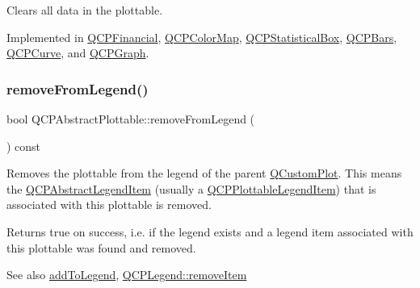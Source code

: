 Clears all data in the plottable. 

Implemented in \mbox{\hyperlink{class_q_c_p_financial_a11fd49928c33e55e27b7319c6927864a}{Q\+C\+P\+Financial}}, \mbox{\hyperlink{class_q_c_p_color_map_a0545dce5383766885912331705a8e099}{Q\+C\+P\+Color\+Map}}, \mbox{\hyperlink{class_q_c_p_statistical_box_a19112994449df0c20287858436cc68e3}{Q\+C\+P\+Statistical\+Box}}, \mbox{\hyperlink{class_q_c_p_bars_a11dbbd707132f07f862dff13c5789c2b}{Q\+C\+P\+Bars}}, \mbox{\hyperlink{class_q_c_p_curve_ae0462c61dbfbac07db0736ec64110241}{Q\+C\+P\+Curve}}, and \mbox{\hyperlink{class_q_c_p_graph_ad4e94a4e44e5e76fbec81a72a977157d}{Q\+C\+P\+Graph}}.

\mbox{\label{class_q_c_p_abstract_plottable_ac95fb2604d9106d0852ad9ceb326fe8c}} 
\subsubsection{\texorpdfstring{remove\+From\+Legend()}{removeFromLegend()}}
{\footnotesize\ttfamily bool Q\+C\+P\+Abstract\+Plottable\+::remove\+From\+Legend (\begin{DoxyParamCaption}{ }\end{DoxyParamCaption}) const\hspace{0.3cm}{\ttfamily [virtual]}}

Removes the plottable from the legend of the parent \mbox{\hyperlink{class_q_custom_plot}{Q\+Custom\+Plot}}. This means the \mbox{\hyperlink{class_q_c_p_abstract_legend_item}{Q\+C\+P\+Abstract\+Legend\+Item}} (usually a \mbox{\hyperlink{class_q_c_p_plottable_legend_item}{Q\+C\+P\+Plottable\+Legend\+Item}}) that is associated with this plottable is removed.

Returns true on success, i.\+e. if the legend exists and a legend item associated with this plottable was found and removed.

\begin{DoxySeeAlso}{See also}
\mbox{\hyperlink{class_q_c_p_abstract_plottable_a70f8cabfd808f7d5204b9f18c45c13f5}{add\+To\+Legend}}, \mbox{\hyperlink{class_q_c_p_legend_ac91595c3eaa746fe6321d2eb952c63bb}{Q\+C\+P\+Legend\+::remove\+Item}} 
\end{DoxySeeAlso}
\mbox{\label{class_q_c_p_abstract_plottable_a1491c4a606bccd2d09e65e11b79eb882}} 
